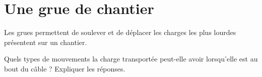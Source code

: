 \section{Une grue de chantier}

Les grues permettent de soulever et de déplacer les charges les plus lourdes présentent sur un chantier.

\begin{questions}
	\question Quels types de mouvements la charge transportée peut-elle avoir lorsqu'elle est au bout du câble ? Expliquer les réponses.
\end{questions}

\fillwithdottedlines{5cm}